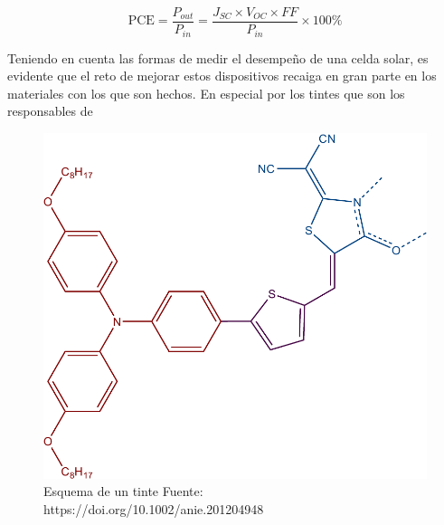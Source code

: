 \begin{equation}
    \text{PCE} = \frac{P_{out}}{P_{in}}  =\frac{J_{SC}\times V_{OC} \times FF}{P_{in}} \times 100\%
    \label{eqn:pce}
\end{equation}

Teniendo en cuenta las formas de medir el desempeño de una celda solar, es evidente que el reto de mejorar estos dispositivos recaiga en gran parte en los materiales con los que son hechos. En especial por los tintes que son los responsables de 

\begin{figure}[h!]
    \begin{center}
        \includegraphics[scale=0.5]{img/dye_scheme.pdf}
    \end{center}
    \caption{Esquema de un tinte Fuente: https://doi.org/10.1002/anie.201204948}
    \label{img:tinte}
\end{figure}

